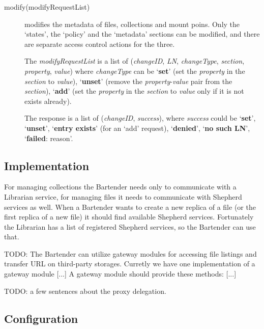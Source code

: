 \documentclass{book}
\begin{document}
\begin{description}
    \item[modify(modifyRequestList)] modifies the metadata of files, collections and mount poins. Only the `states', the `policy' and the `metadata' sections can be modified, and there are separate access control actions for the three.
    
    The \emph{modifyRequestList} is a list of (\emph{changeID}, \emph{LN}, \emph{changeType}, \emph{section}, \emph{property}, \emph{value}) where \emph{changeType} can be `\textbf{set}' (set the \emph{property} in the \emph{section} to \emph{value}), `\textbf{unset}' (remove the \emph{property}-\emph{value} pair from the \emph{section}), `\textbf{add}' (set the \emph{property} in the \emph{section} to \emph{value} only if it is not exists already). 

    The response is a list of (\emph{changeID}, \emph{success}), where \emph{success} could be  `\textbf{set}', `\textbf{unset}', `\textbf{entry exists}' (for an `add' request), `\textbf{denied}', `\textbf{no such LN}', `\textbf{failed}: reason'.
    
\end{description}


\subsection{Implementation} %

For managing collections the Bartender needs only to communicate with a Librarian service, for managing files it needs to communicate with Shepherd services as well. When a Bartender wants to create a new replica of a file (or the first replica of a new file) it should find available Shepherd services. Fortunately the Librarian has a list of registered Shepherd services, so the Bartender can use that.

TODO: The Bartender can utilize gateway modules for accessing file listings and transfer URL on third-party storages. Curretly we have one implementation of a gateway module [...] A gateway module should provide these methods: [...] 

TODO: a few sentences about the proxy delegation.


\subsection{Configuration} %
\end{document}
